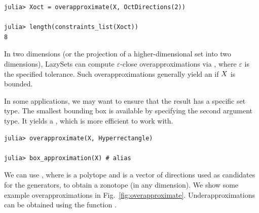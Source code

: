 \begin{minipage}{\linewidth}
\vspace{-\abovedisplayskip}
\begin{lstlisting}
julia> Xoct = overapproximate(X, OctDirections(2))

julia> length(constraints_list(Xoct))
8
\end{lstlisting}
\end{minipage}

In two dimensions (or the projection of a higher-dimensional set into two dimensions), LazySets can compute $\varepsilon$-close overapproximations via , where $\varepsilon$ is the specified tolerance.
%
Such overapproximations generally yield an  if $X$ is bounded.

\smallskip

In some applications, we may want to ensure that the result has a specific set type.
The smallest bounding box is available by specifying the second argument type. It yields a , which is more efficient to work with.

\begin{minipage}{\linewidth}
	\vspace{-\abovedisplayskip}
	\begin{lstlisting}
julia> overapproximate(X, Hyperrectangle)

julia> box_approximation(X) # alias
\end{lstlisting}
\end{minipage}

We can use , where  is a polytope and  is a vector of directions used as candidates for the generators, to obtain a zonotope (in any dimension). We show some example overapproximations in Fig.~\ref{fig:overapproximate}.
Underapproximations can be obtained using the function .
